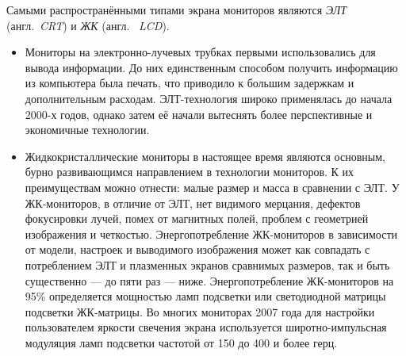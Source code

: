 Самыми распространёнными типами экрана мониторов являются \emph{ЭЛТ} (англ.~\emph{CRT}) и \emph{ЖК} (англ.~ \emph{LCD}).
\begin{itemize}
 \item Мониторы на электронно-лучевых трубках первыми использовались для вывода информации.
  До них единственным способом получить информацию из компьютера была печать, что приводило к большим задержкам и дополнительным расходам.
  ЭЛТ-технология широко применялась до начала 2000-х годов, однако затем её начали вытеснять более перспективные и экономичные технологии.
 \item Жидкокристаллические мониторы в настоящее время являются основным, бурно развивающимся направлением в технологии мониторов.
  К их преимуществам можно отнести: малые размер и масса в сравнении с ЭЛТ.
  У ЖК-мониторов, в отличие от ЭЛТ, нет видимого мерцания, дефектов фокусировки лучей, помех от магнитных полей, проблем с геометрией изображения и четкостью.
  Энергопотребление ЖК-мониторов в зависимости от модели, настроек и выводимого изображения может как совпадать с потреблением ЭЛТ и плазменных экранов сравнимых размеров, так и быть существенно --- до пяти раз --- ниже.
  Энергопотребление ЖК-мониторов на 95\% определяется мощностью ламп подсветки или светодиодной матрицы подсветки ЖК-матрицы.
  Во многих мониторах 2007 года для настройки пользователем яркости свечения экрана используется широтно-импульсная модуляция ламп подсветки частотой от 150 до 400 и более герц.
  

\end{itemize}
